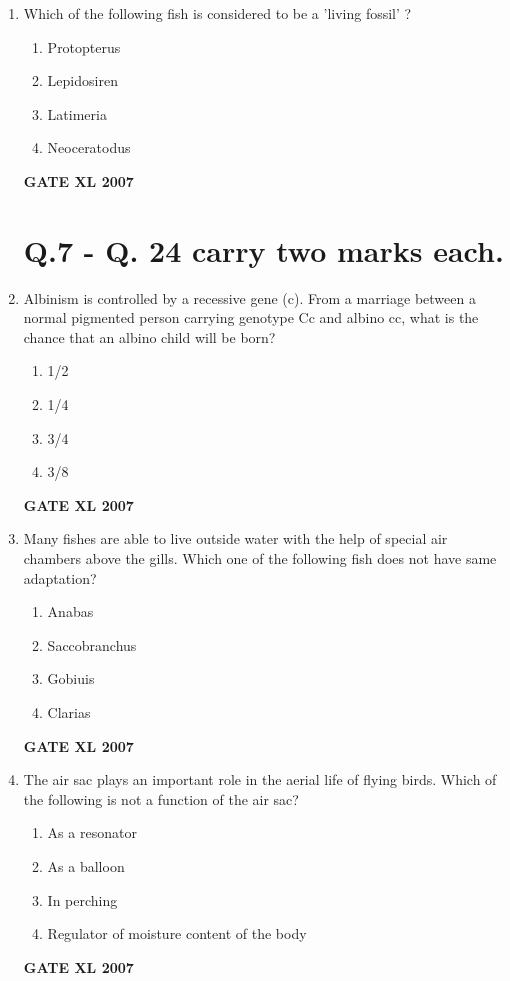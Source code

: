 \documentclass[journal,12pt,onecolumn]{IEEEtran}
\begin{document}
\begin{enumerate}
\item Which of the following fish is considered to be a 'living fossil' ?
\begin{enumerate}
    \item Protopterus
    \item Lepidosiren
    \item Latimeria
    \item Neoceratodus
\end{enumerate}\hfill{\textbf{GATE XL 2007}}

\vspace{2em}

\section*{Q.7 - Q. 24 carry two marks each.}

\item Albinism is controlled by a recessive gene (c). From a marriage between a normal pigmented person carrying genotype Cc and albino cc, what is the chance that an albino child will be born?
\begin{enumerate}
    \item 1/2
    \item 1/4
    \item 3/4
    \item 3/8
\end{enumerate}\hfill{\textbf{GATE XL 2007}}

\item Many fishes are able to live outside water with the help of special air chambers above the gills. Which one of the following fish does not have same adaptation?
\begin{enumerate}
    \item Anabas
    \item Saccobranchus
    \item Gobiuis
    \item Clarias
\end{enumerate}\hfill{\textbf{GATE XL 2007}}

\item The air sac plays an important role in the aerial life of flying birds. Which of the following is not a function of the air sac?
\begin{enumerate}
    \item As a resonator
    \item As a balloon
    \item In perching
    \item Regulator of moisture content of the body
\end{enumerate}\hfill{\textbf{GATE XL 2007}}


\end{enumerate}
\end{document}
